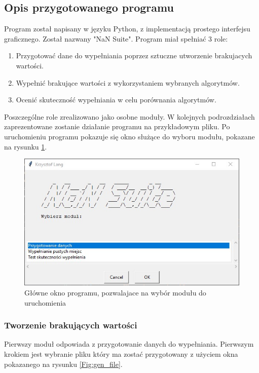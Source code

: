 \documentclass[12pt,twoside]{article}
\begin{document}
\subsection{Opis przygotowanego programu}
Program został napisany w języku Python, z implementacją prostego interfejsu graficznego. Został nazwany "NaN Suite".
Program miał spełniać 3 role:
\begin{enumerate}[label=\arabic*), leftmargin=1.25cm]
    \item Przygotować dane do wypełniania poprzez sztuczne utworzenie brakujacych wartości.
    \item Wypełnić brakujące wartości z wykorzystaniem wybranych algorytmów.
    \item Ocenić skuteczność wypełniania w celu porównania algorytmów.
\end{enumerate}
Poszczególne role zrealizowano jako osobne moduły. W kolejnych podrozdziałach zaprezentowane zostanie działanie programu na przykładowym pliku.
Po uruchomieniu programu pokazuje się okno służące do wyboru modułu, pokazane na rysunku \ref{Fig:main}.

\begin{figure}[ht]
	\centering
	\includegraphics[width=12cm]{img/01.jpg}
	\caption{Główne okno programu, pozwalajace na wybór modułu do uruchomienia}
\label{Fig:main}
\end{figure}

\subsubsection{Tworzenie brakujących wartości}
Pierwszy moduł odpowiada z przygotowanie danych do wypełniania.
Pierwszym krokiem jest wybranie pliku który ma zostać przygotowany z użyciem okna pokazanego na rysunku \ref{Fig:gen_file}.
\end{document}
